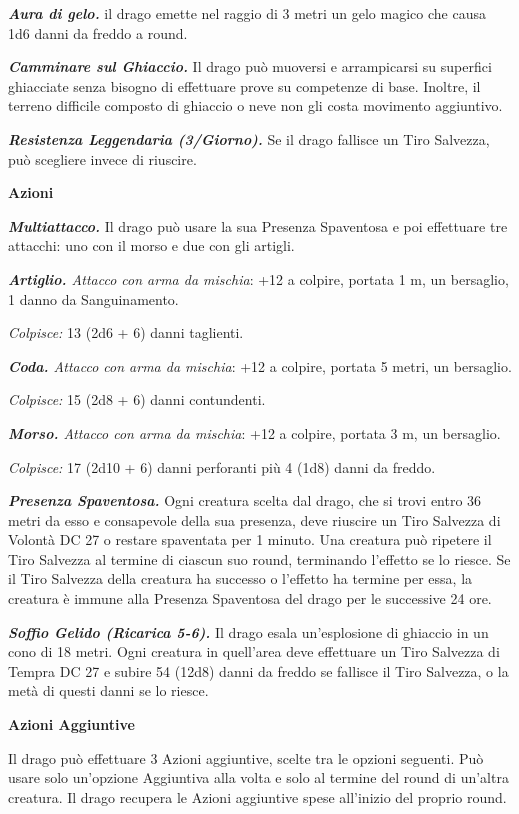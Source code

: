 \begin{multicols}{2}
{\emph{\textbf{Aura di gelo.}} il drago emette nel raggio di 3 metri un gelo magico che causa 1d6 danni da freddo a round.

\emph{\textbf{Camminare sul Ghiaccio.}} Il drago può muoversi e arrampicarsi su superfici ghiacciate senza bisogno di effettuare prove su competenze di base. Inoltre, il terreno difficile composto di ghiaccio o neve non gli costa movimento aggiuntivo.

\emph{\textbf{Resistenza Leggendaria (3/Giorno).}} Se il drago fallisce un Tiro Salvezza, può scegliere invece di riuscire.

\textbf{Azioni}

\emph{\textbf{Multiattacco.}} Il drago può usare la sua Presenza Spaventosa e poi effettuare tre attacchi: uno con il morso e due con gli artigli.

\emph{\textbf{Artiglio.} Attacco con arma da mischia}: +12 a colpire, portata 1 m, un bersaglio, 1 danno da Sanguinamento.

\emph{Colpisce:} 13 (2d6 + 6) danni taglienti.

\emph{\textbf{Coda.} Attacco con arma da mischia}: +12 a colpire, portata 5 metri, un bersaglio.

\emph{Colpisce:} 15 (2d8 + 6) danni contundenti.

\emph{\textbf{Morso.} Attacco con arma da mischia}: +12 a colpire, portata 3 m, un bersaglio.

\emph{Colpisce:} 17 (2d10 + 6) danni perforanti più 4 (1d8) danni da freddo.

\emph{\textbf{Presenza Spaventosa.}} Ogni creatura scelta dal drago, che si trovi entro 36 metri da esso e consapevole della sua presenza, deve riuscire un Tiro Salvezza di Volontà DC 27 o restare spaventata per 1 minuto. Una creatura può ripetere il Tiro Salvezza al termine di ciascun suo round, terminando l'effetto se lo riesce. Se il Tiro Salvezza della creatura ha successo o l'effetto ha termine per essa, la creatura è immune alla Presenza Spaventosa del drago per le successive 24 ore.

\emph{\textbf{Soffio Gelido (Ricarica 5-6).}} Il drago esala un'esplosione di ghiaccio in un cono di 18 metri. Ogni creatura in quell'area deve effettuare un Tiro Salvezza di Tempra DC 27 e subire 54 (12d8) danni da freddo se fallisce il Tiro Salvezza, o la metà di questi danni se lo riesce.

\textbf{Azioni Aggiuntive}

Il drago può effettuare 3 Azioni aggiuntive, scelte tra le opzioni seguenti. Può usare solo un'opzione Aggiuntiva alla volta e solo al termine del round di un'altra creatura. Il drago recupera le Azioni aggiuntive spese all'inizio del proprio round.

}
\end{multicols}
